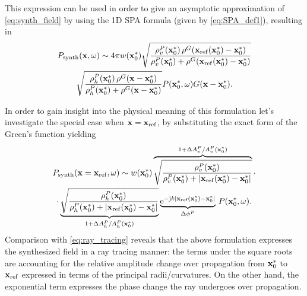 \documentclass[lettersize,journal]{IEEEtran}
\begin{document}
This expression can be used in order to give an asymptotic approximation of  \eqref{eq:synth_field} by using the 1D SPA formula (given by \eqref{eq:SPA_def1}), resulting in
\begin{multline}
  P_{\mathrm{synth}}(\mathbf{x},\omega) \sim 4\pi w(\mathbf{x}_0^*)  \sqrt{\frac{ \rho^P_v(\mathbf{x}_0^*) \, \rho^G(\mathbf{x}_{\mathrm{ref}}(\mathbf{x}_0^*)-\mathbf{x}_0^*) }{ \rho^P_v(\mathbf{x}_0^*) + \rho^G(\mathbf{x}_{\mathrm{ref}}(\mathbf{x}_0^*)-\mathbf{x}_0^*)} } \\ 
  \sqrt{\frac{\rho^P_h(\mathbf{x}_0^*) \, \rho^G(\mathbf{x}-\mathbf{x}_0^*)}{  \rho^P_h(\mathbf{x}_0^*) + \rho^G(\mathbf{x}-\mathbf{x}_0^*)}}
   P(\mathbf{x}_0^*, \omega) G(\mathbf{x}-\mathbf{x}_0^*).
   \label{eq:amp_distribution}
\end{multline}

In order to gain insight into the physical meaning of this formulation let's investigate the special case when $\mathbf{x} = \mathbf{x}_{\mathrm{ref}}$, by substituting the exact form of the Green's function yielding
\begin{multline}
  P_{\mathrm{synth}}(\mathbf{x} = \mathbf{x}_{\mathrm{ref}},\omega) \sim w(\mathbf{x}_0^*)  
  \overbrace{\sqrt{\frac{ \rho^P_v(\mathbf{x}_0^*) }{ \rho^P_v(\mathbf{x}_0^*) + |\mathbf{x}_{\mathrm{ref}}(\mathbf{x}_0^*)-\mathbf{x}_0^*|} } }^{1 + \Delta A^P_v/A^P_v(\mathbf{x}_0^*)}
  \cdot \\ 
  \cdot 
  \underbrace{\sqrt{\frac{\rho^P_h(\mathbf{x}_0^*)}{  \rho^P_h(\mathbf{x}_0^*) + |\mathbf{x}_{\mathrm{ref}}(\mathbf{x}_0^*)-\mathbf{x}_0^*|}}}_{1 + \Delta A^P_h/A^P_h(\mathbf{x}_0^*)}
  \underbrace{\mathrm{e}^{-\mathrm{j} k |\mathbf{x}_{\mathrm{ref}}(\mathbf{x}_0^*)-\mathbf{x}_0^*|}}_{\Delta \phi^P}
   \, P(\mathbf{x}_0^*, \omega).
   \label{eq:Psynth_at_xref}
\end{multline}
Comparison with \eqref{eq:ray_tracing} reveals that the above formulation expresses the synthesized field in a ray tracing manner:
the terms under the square roots are accounting for the relative amplitude change over propagation from $\mathbf{x}_0^*$ to $\mathbf{x}_{\mathrm{ref}}$ expressed in terms of the principal radii/curvatures.
On the other hand, the exponential term expresses the phase change the ray undergoes over propagation.
\end{document}

